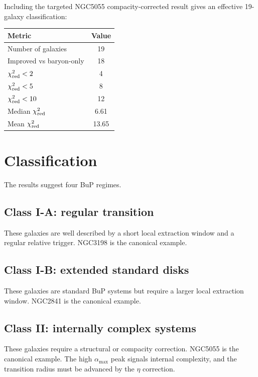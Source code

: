 \documentclass[11pt,a4paper]{article}
\begin{document}
Including the targeted NGC5055 compacity-corrected result gives an effective
19-galaxy classification:

\begin{table}[h]
\centering
\begin{tabular}{lc}
\toprule
Metric & Value \\
\midrule
Number of galaxies & 19 \\
Improved vs baryon-only & 18 \\
\(\chi^2_{\rm red}<2\) & 4 \\
\(\chi^2_{\rm red}<5\) & 8 \\
\(\chi^2_{\rm red}<10\) & 12 \\
Median \(\chi^2_{\rm red}\) & 6.61 \\
Mean \(\chi^2_{\rm red}\) & 13.65 \\
\bottomrule
\end{tabular}
\end{table}

\section{Classification}

The results suggest four BuP regimes.

\subsection{Class I-A: regular transition}

These galaxies are well described by a short local extraction window and a
regular relative trigger. NGC3198 is the canonical example.

\subsection{Class I-B: extended standard disks}

These galaxies are standard BuP systems but require a larger local extraction
window. NGC2841 is the canonical example.

\subsection{Class II: internally complex systems}

These galaxies require a structural or compacity correction. NGC5055 is the
canonical example. The high \(\alpha_{\max}\) peak signals internal complexity,
and the transition radius must be advanced by the \(\eta\) correction.
\end{document}
